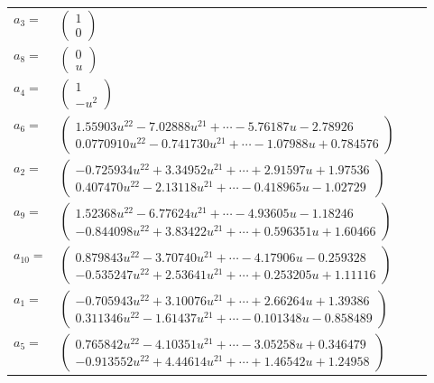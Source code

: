 \documentclass[1p]{elsarticle_modified}
\theoremstyle{definition}
\begin{document}
\begin{tabular}{m{7pt} m{180pt} m{7pt} m{180pt} }
\flushright $a_{3}=$&$\begin{pmatrix}1\\0\end{pmatrix}$ \\
\flushright $a_{8}=$&$\begin{pmatrix}0\\u\end{pmatrix}$ \\
\flushright $a_{4}=$&$\begin{pmatrix}1\\- u^2\end{pmatrix}$ \\
\flushright $a_{6}=$&$\begin{pmatrix}1.55903 u^{22}-7.02888 u^{21}+\cdots-5.76187 u-2.78926\\0.0770910 u^{22}-0.741730 u^{21}+\cdots-1.07988 u+0.784576\end{pmatrix}$ \\
\flushright $a_{2}=$&$\begin{pmatrix}-0.725934 u^{22}+3.34952 u^{21}+\cdots+2.91597 u+1.97536\\0.407470 u^{22}-2.13118 u^{21}+\cdots-0.418965 u-1.02729\end{pmatrix}$ \\
\flushright $a_{9}=$&$\begin{pmatrix}1.52368 u^{22}-6.77624 u^{21}+\cdots-4.93605 u-1.18246\\-0.844098 u^{22}+3.83422 u^{21}+\cdots+0.596351 u+1.60466\end{pmatrix}$ \\
\flushright $a_{10}=$&$\begin{pmatrix}0.879843 u^{22}-3.70740 u^{21}+\cdots-4.17906 u-0.259328\\-0.535247 u^{22}+2.53641 u^{21}+\cdots+0.253205 u+1.11116\end{pmatrix}$ \\
\flushright $a_{1}=$&$\begin{pmatrix}-0.705943 u^{22}+3.10076 u^{21}+\cdots+2.66264 u+1.39386\\0.311346 u^{22}-1.61437 u^{21}+\cdots-0.101348 u-0.858489\end{pmatrix}$ \\
\flushright $a_{5}=$&$\begin{pmatrix}0.765842 u^{22}-4.10351 u^{21}+\cdots-3.05258 u+0.346479\\-0.913552 u^{22}+4.44614 u^{21}+\cdots+1.46542 u+1.24958\end{pmatrix}$ \\

\end{tabular}
\end{document}
